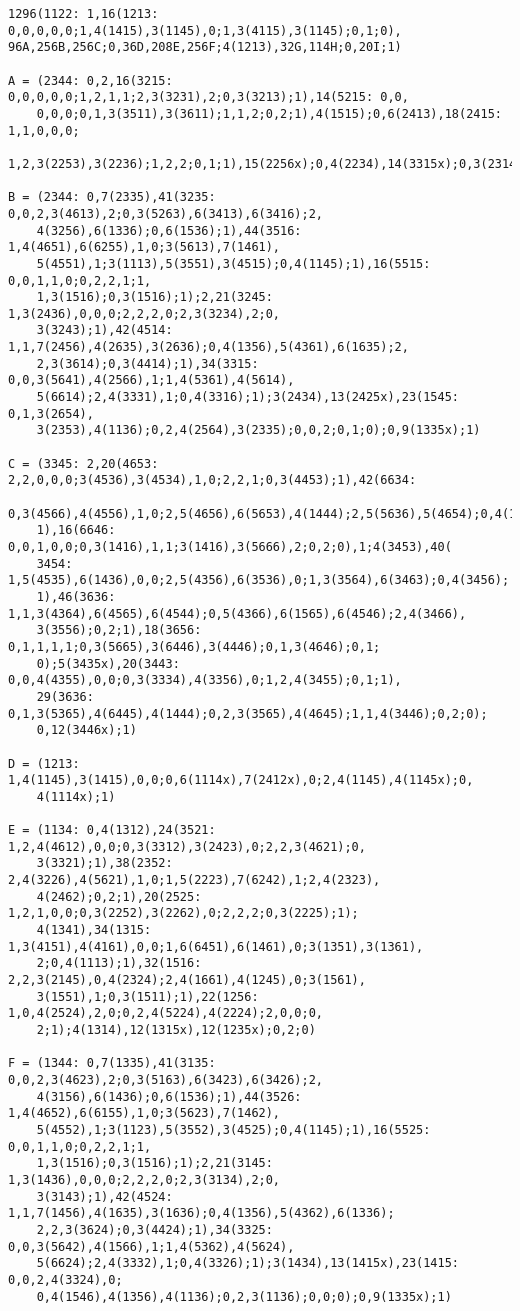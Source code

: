 \scriptsize
\begin{verbatim}
1296(1122: 1,16(1213: 0,0,0,0,0;1,4(1415),3(1145),0;1,3(4115),3(1145);0,1;0),
96A,256B,256C;0,36D,208E,256F;4(1213),32G,114H;0,20I;1)

A = (2344: 0,2,16(3215: 0,0,0,0,0;1,2,1,1;2,3(3231),2;0,3(3213);1),14(5215: 0,0,
    0,0,0;0,1,3(3511),3(3611);1,1,2;0,2;1),4(1515);0,6(2413),18(2415: 1,1,0,0,0;
    1,2,3(2253),3(2236);1,2,2;0,1;1),15(2256x);0,4(2234),14(3315x);0,3(2314);0)

B = (2344: 0,7(2335),41(3235: 0,0,2,3(4613),2;0,3(5263),6(3413),6(3416);2,
    4(3256),6(1336);0,6(1536);1),44(3516: 1,4(4651),6(6255),1,0;3(5613),7(1461),
    5(4551),1;3(1113),5(3551),3(4515);0,4(1145);1),16(5515: 0,0,1,1,0;0,2,2,1;1,
    1,3(1516);0,3(1516);1);2,21(3245: 1,3(2436),0,0,0;2,2,2,0;2,3(3234),2;0,
    3(3243);1),42(4514: 1,1,7(2456),4(2635),3(2636);0,4(1356),5(4361),6(1635);2,
    2,3(3614);0,3(4414);1),34(3315: 0,0,3(5641),4(2566),1;1,4(5361),4(5614),
    5(6614);2,4(3331),1;0,4(3316);1);3(2434),13(2425x),23(1545: 0,1,3(2654),
    3(2353),4(1136);0,2,4(2564),3(2335);0,0,2;0,1;0);0,9(1335x);1)

C = (3345: 2,20(4653: 2,2,0,0,0;3(4536),3(4534),1,0;2,2,1;0,3(4453);1),42(6634:
    0,3(4566),4(4556),1,0;2,5(4656),6(5653),4(1444);2,5(5636),5(4654);0,4(1413);
    1),16(6646: 0,0,1,0,0;0,3(1416),1,1;3(1416),3(5666),2;0,2;0),1;4(3453),40(
    3454: 1,5(4535),6(1436),0,0;2,5(4356),6(3536),0;1,3(3564),6(3463);0,4(3456);
    1),46(3636: 1,1,3(4364),6(4565),6(4544);0,5(4366),6(1565),6(4546);2,4(3466),
    3(3556);0,2;1),18(3656: 0,1,1,1,1;0,3(5665),3(6446),3(4446);0,1,3(4646);0,1;
    0);5(3435x),20(3443: 0,0,4(4355),0,0;0,3(3334),4(3356),0;1,2,4(3455);0,1;1),
    29(3636: 0,1,3(5365),4(6445),4(1444);0,2,3(3565),4(4645);1,1,4(3446);0,2;0);
    0,12(3446x);1)

D = (1213: 1,4(1145),3(1415),0,0;0,6(1114x),7(2412x),0;2,4(1145),4(1145x);0,
    4(1114x);1)

E = (1134: 0,4(1312),24(3521: 1,2,4(4612),0,0;0,3(3312),3(2423),0;2,2,3(4621);0,
    3(3321);1),38(2352: 2,4(3226),4(5621),1,0;1,5(2223),7(6242),1;2,4(2323),
    4(2462);0,2;1),20(2525: 1,2,1,0,0;0,3(2252),3(2262),0;2,2,2;0,3(2225);1);
    4(1341),34(1315: 1,3(4151),4(4161),0,0;1,6(6451),6(1461),0;3(1351),3(1361),
    2;0,4(1113);1),32(1516: 2,2,3(2145),0,4(2324);2,4(1661),4(1245),0;3(1561),
    3(1551),1;0,3(1511);1),22(1256: 1,0,4(2524),2,0;0,2,4(5224),4(2224);2,0,0;0,
    2;1);4(1314),12(1315x),12(1235x);0,2;0)

F = (1344: 0,7(1335),41(3135: 0,0,2,3(4623),2;0,3(5163),6(3423),6(3426);2,
    4(3156),6(1436);0,6(1536);1),44(3526: 1,4(4652),6(6155),1,0;3(5623),7(1462),
    5(4552),1;3(1123),5(3552),3(4525);0,4(1145);1),16(5525: 0,0,1,1,0;0,2,2,1;1,
    1,3(1516);0,3(1516);1);2,21(3145: 1,3(1436),0,0,0;2,2,2,0;2,3(3134),2;0,
    3(3143);1),42(4524: 1,1,7(1456),4(1635),3(1636);0,4(1356),5(4362),6(1336);
    2,2,3(3624);0,3(4424);1),34(3325: 0,0,3(5642),4(1566),1;1,4(5362),4(5624),
    5(6624);2,4(3332),1;0,4(3326);1);3(1434),13(1415x),23(1415: 0,0,2,4(3324),0;
    0,4(1546),4(1356),4(1136);0,2,3(1136);0,0;0);0,9(1335x);1)


\end{verbatim}

